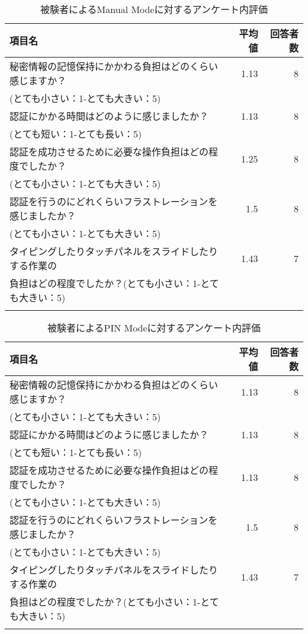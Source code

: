 \begin{table}[t]
  \caption{被験者によるManual Modeに対するアンケート内評価}
  \label{tab:manual.enquete}
  \begin{center}
    \small
    \begin{tabular}{lrr}
      \bhline
      項目名 & 平均値 & 回答者数 \\ \hline
      秘密情報の記憶保持にかかわる負担はどのくらい感じますか？ & 1.13 & 8 \\
      (とても小さい：1-とても大きい：5) & & \\
      認証にかかる時間はどのように感じましたか？ & 1.13 & 8 \\
      (とても短い：1-とても長い：5) & & \\
      認証を成功させるために必要な操作負担はどの程度でしたか？ & 1.25 & 8 \\
      (とても小さい：1-とても大きい：5) & & \\
      認証を行うのにどれくらいフラストレーションを感じましたか？ & 1.5 & 8 \\
      (とても小さい：1-とても大きい：5) & & \\
      タイピングしたりタッチパネルをスライドしたりする作業の & 1.43 & 7 \\
      負担はどの程度でしたか？(とても小さい：1-とても大きい：5) & & \\
      \bhline
    \end{tabular}
  \end{center}
\end{table}
\begin{table}[b]
  \caption{被験者によるPIN Modeに対するアンケート内評価}
  \label{tab:pin.enquete}
  \begin{center}
    \small
    \begin{tabular}{lrr}
      \bhline
      項目名 & 平均値 & 回答者数 \\ \hline
      秘密情報の記憶保持にかかわる負担はどのくらい感じますか？ & 1.13 & 8 \\
      (とても小さい：1-とても大きい：5) & & \\
      認証にかかる時間はどのように感じましたか？ & 1.13 & 8 \\
      (とても短い：1-とても長い：5) & & \\
      認証を成功させるために必要な操作負担はどの程度でしたか？ & 1.13 & 8 \\
      (とても小さい：1-とても大きい：5) & & \\
      認証を行うのにどれくらいフラストレーションを感じましたか？ & 1.5 & 8 \\
      (とても小さい：1-とても大きい：5) & & \\
      タイピングしたりタッチパネルをスライドしたりする作業の & 1.43 & 7 \\
      負担はどの程度でしたか？(とても小さい：1-とても大きい：5) & & \\
      \bhline
    \end{tabular}
  \end{center}
\end{table}

